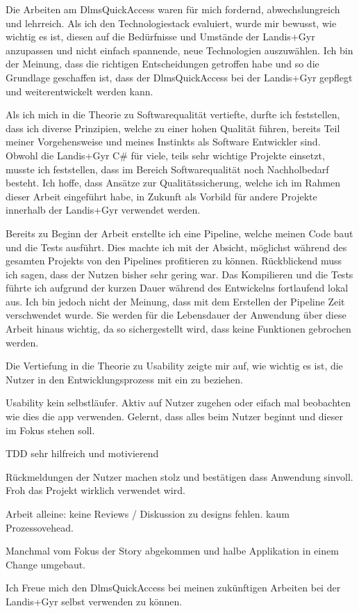 Die Arbeiten am DlmsQuickAccess waren für mich fordernd, abwechslungreich und lehrreich.
Als ich den Technologiestack evaluiert, wurde mir bewusst, wie wichtig es ist, diesen auf die Bedürfnisse und Umstände der Landis+Gyr anzupassen und nicht einfach spannende, neue Technologien auszuwählen.
Ich bin der Meinung, dass die richtigen Entscheidungen getroffen habe und so die Grundlage geschaffen ist, dass der DlmsQuickAccess bei der Landis+Gyr gepflegt und weiterentwickelt werden kann.

Als ich mich in die Theorie zu Softwarequalität vertiefte, durfte ich feststellen, dass ich diverse Prinzipien, welche zu einer hohen Qualität führen, bereits Teil meiner Vorgehensweise und meines Instinkts als Software Entwickler sind.
Obwohl die Landis+Gyr C\# für viele, teils sehr wichtige Projekte einsetzt, musste ich feststellen, dass im Bereich Softwarequalität noch Nachholbedarf besteht.
Ich hoffe, dass Ansätze zur Qualitätssicherung, welche ich im Rahmen dieser Arbeit eingeführt habe, in Zukunft als Vorbild für andere Projekte innerhalb der Landis+Gyr verwendet werden.

Bereits zu Beginn der Arbeit erstellte ich eine Pipeline, welche meinen Code baut und die Tests ausführt.
Dies machte ich mit der Absicht, möglichst während des gesamten Projekts von den Pipelines profitieren zu können.
Rückblickend muss ich sagen, dass der Nutzen bisher sehr gering war.
Das Kompilieren und die Tests führte ich aufgrund der kurzen Dauer während des Entwickelns fortlaufend lokal aus.
Ich bin jedoch nicht der Meinung, dass mit dem Erstellen der Pipeline Zeit verschwendet wurde.
Sie werden für die Lebensdauer der Anwendung über diese Arbeit hinaus wichtig, da so sichergestellt wird, dass keine Funktionen gebrochen werden.

Die Vertiefung in die Theorie zu Usability zeigte mir auf, wie wichtig es ist, die Nutzer in den Entwicklungsprozess mit ein zu beziehen.


Usability kein selbstläufer.
Aktiv auf Nutzer zugehen oder eifach mal beobachten wie dies die app verwenden.
Gelernt, dass alles beim Nutzer beginnt und dieser im Fokus stehen soll.

TDD sehr hilfreich und motivierend

Rückmeldungen der Nutzer machen stolz und bestätigen dass Anwendung sinvoll.
Froh das Projekt wirklich verwendet wird. 

Arbeit alleine: keine Reviews / Diskussion zu designs fehlen.
kaum Prozessovehead.

Manchmal vom Fokus der Story abgekommen und halbe Applikation in einem Change umgebaut.

Ich Freue mich den DlmsQuickAccess bei meinen zukünftigen Arbeiten bei der Landis+Gyr selbst verwenden zu können.

